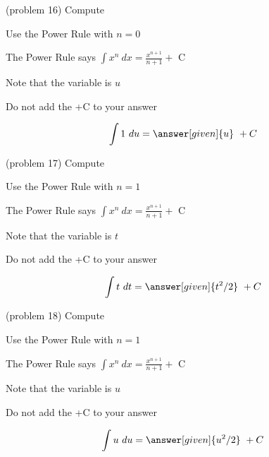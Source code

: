 \documentclass{ximera}
\begin{document}
\begin{problem}(problem 16)
Compute 



\begin{hint}
Use the Power Rule with $n=0$
\end{hint}
\begin{hint}
The Power Rule says $\int x^n \ dx = \frac{x^{n+1}}{n+1} +$ C
\end{hint}
\begin{hint}
Note that the variable is $u$
\end{hint}
\begin{hint}
\begin{center}
Do not add the +C to your answer
\end{center}
\end{hint}

\[
\int 1 \ du =
\answer[given]{u} \ + C
\]
\end{problem}




\begin{problem}(problem 17)
Compute 

\begin{hint}
Use the Power Rule with $n=1$
\end{hint}
\begin{hint}
The Power Rule says $\int x^n \ dx = \frac{x^{n+1}}{n+1} +$ C
\end{hint}
\begin{hint}
Note that the variable is $t$
\end{hint}
\begin{hint}
\begin{center}
Do not add the +C to your answer
\end{center}
\end{hint}

\[
\int t \ dt =
\answer[given]{t^2 /2} \ + C
\]
\end{problem}



\begin{problem}(problem 18)
Compute 

\begin{hint}
Use the Power Rule with $n=1$
\end{hint}
\begin{hint}
The Power Rule says $\int x^n \ dx = \frac{x^{n+1}}{n+1} +$ C
\end{hint}
\begin{hint}
Note that the variable is $u$
\end{hint}
\begin{hint}
\begin{center}
Do not add the +C to your answer
\end{center}
\end{hint}

\[
\int u \ du =
\answer[given]{u^2 /2} \ + C
\]
\end{problem}
\end{document}
